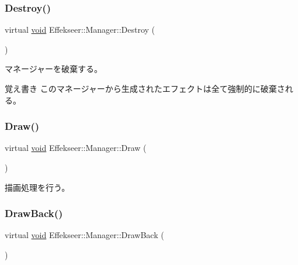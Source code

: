\subsubsection{\texorpdfstring{Destroy()}{Destroy()}}
{\footnotesize\ttfamily virtual \mbox{\hyperlink{namespace_effekseer_ab34c4088e512200cf4c2716f168deb56}{void}} Effekseer\+::\+Manager\+::\+Destroy (\begin{DoxyParamCaption}{ }\end{DoxyParamCaption})\hspace{0.3cm}{\ttfamily [pure virtual]}}



マネージャーを破棄する。 

\begin{DoxyNote}{覚え書き}
このマネージャーから生成されたエフェクトは全て強制的に破棄される。 
\end{DoxyNote}
\mbox{\label{class_effekseer_1_1_manager_a17431b7d96325535fa62bcbb066f0a9c}} 
\subsubsection{\texorpdfstring{Draw()}{Draw()}}
{\footnotesize\ttfamily virtual \mbox{\hyperlink{namespace_effekseer_ab34c4088e512200cf4c2716f168deb56}{void}} Effekseer\+::\+Manager\+::\+Draw (\begin{DoxyParamCaption}{ }\end{DoxyParamCaption})\hspace{0.3cm}{\ttfamily [pure virtual]}}



描画処理を行う。 

\mbox{\label{class_effekseer_1_1_manager_abcb4f71e94b1ff2ee3b8088fc53f4841}} 
\subsubsection{\texorpdfstring{Draw\+Back()}{DrawBack()}}
{\footnotesize\ttfamily virtual \mbox{\hyperlink{namespace_effekseer_ab34c4088e512200cf4c2716f168deb56}{void}} Effekseer\+::\+Manager\+::\+Draw\+Back (\begin{DoxyParamCaption}{ }\end{DoxyParamCaption})\hspace{0.3cm}{\ttfamily [pure virtual]}}



